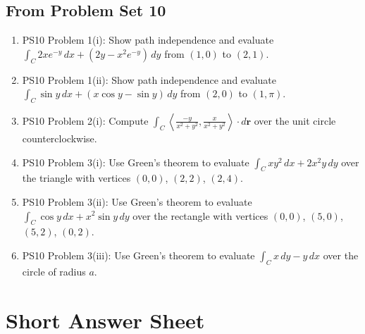 \documentclass[11pt]{article}
\begin{document}
\subsection*{From Problem Set 10}
\begin{enumerate}
\item PS10 Problem 1(i): Show path independence and evaluate $\int_C 2xe^{-y}\,dx+(2y-x^2e^{-y})\,dy$ from $(1,0)$ to $(2,1)$.
\item PS10 Problem 1(ii): Show path independence and evaluate $\int_C\sin y\,dx+(x\cos y-\sin y)\,dy$ from $(2,0)$ to $(1,\pi)$.
\item PS10 Problem 2(i): Compute $\int_C \left\langle\frac{-y}{x^2+y^2},\frac{x}{x^2+y^2}\right\rangle\cdot d\mathbf r$ over the unit circle counterclockwise.
\item PS10 Problem 3(i): Use Green's theorem to evaluate $\int_C xy^2\,dx+2x^2y\,dy$ over the triangle with vertices $(0,0)$, $(2,2)$, $(2,4)$.
\item PS10 Problem 3(ii): Use Green's theorem to evaluate $\int_C\cos y\,dx+x^2\sin y\,dy$ over the rectangle with vertices $(0,0)$, $(5,0)$, $(5,2)$, $(0,2)$.
\item PS10 Problem 3(iii): Use Green's theorem to evaluate $\int_C x\,dy-y\,dx$ over the circle of radius $a$.
\end{enumerate}

\section{Short Answer Sheet}
\end{document}
